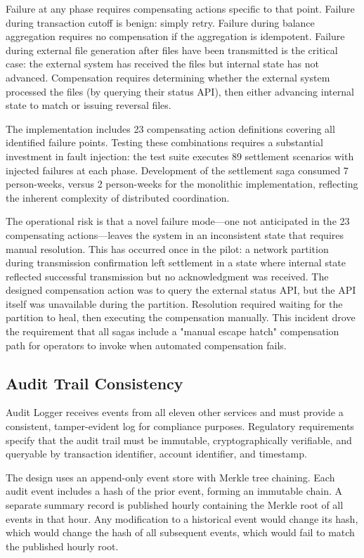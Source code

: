 Failure at any phase requires compensating actions specific to that point. Failure during transaction cutoff is benign: simply retry. Failure during balance aggregation requires no compensation if the aggregation is idempotent. Failure during external file generation after files have been transmitted is the critical case: the external system has received the files but internal state has not advanced. Compensation requires determining whether the external system processed the files (by querying their status API), then either advancing internal state to match or issuing reversal files.

The implementation includes 23 compensating action definitions covering all identified failure points. Testing these combinations requires a substantial investment in fault injection: the test suite executes 89 settlement scenarios with injected failures at each phase. Development of the settlement saga consumed 7 person-weeks, versus 2 person-weeks for the monolithic implementation, reflecting the inherent complexity of distributed coordination.

The operational risk is that a novel failure mode—one not anticipated in the 23 compensating actions—leaves the system in an inconsistent state that requires manual resolution. This has occurred once in the pilot: a network partition during transmission confirmation left settlement in a state where internal state reflected successful transmission but no acknowledgment was received. The designed compensation action was to query the external status API, but the API itself was unavailable during the partition. Resolution required waiting for the partition to heal, then executing the compensation manually. This incident drove the requirement that all sagas include a "manual escape hatch" compensation path for operators to invoke when automated compensation fails.

\subsection{Audit Trail Consistency}

Audit Logger receives events from all eleven other services and must provide a consistent, tamper-evident log for compliance purposes. Regulatory requirements specify that the audit trail must be immutable, cryptographically verifiable, and queryable by transaction identifier, account identifier, and timestamp.

The design uses an append-only event store with Merkle tree chaining. Each audit event includes a hash of the prior event, forming an immutable chain. A separate summary record is published hourly containing the Merkle root of all events in that hour. Any modification to a historical event would change its hash, which would change the hash of all subsequent events, which would fail to match the published hourly root.

